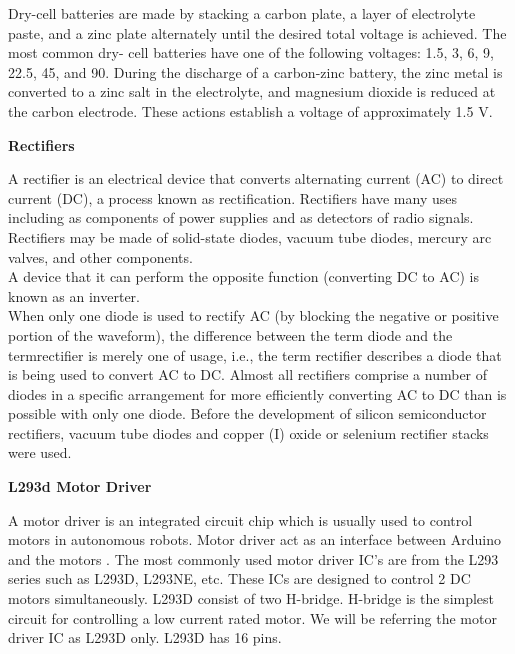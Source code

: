 \documentclass[a4paper,12pt, English]{article}
\begin{document}
\begin{normalsize}
Dry-cell batteries are made by stacking a carbon plate, a layer of electrolyte paste, and a zinc
plate alternately until the desired total voltage is achieved. The most common dry- cell batteries
have one of the following voltages: 1.5, 3, 6, 9, 22.5, 45, and 90. During the discharge of a
carbon-zinc battery, the zinc metal is converted to a zinc salt in the electrolyte, and magnesium
dioxide is reduced at the carbon electrode. These actions establish a voltage of approximately
1.5 V.\\
\newline
\begin{large}
\textbf{Rectifiers}
\end{large}
\newline
A rectifier is an electrical device that converts alternating current (AC) to direct
current (DC), a process known as rectification. Rectifiers have many uses including as
components of power supplies and as detectors of radio signals. Rectifiers may be made of
solid-state diodes, vacuum tube diodes, mercury arc valves, and other components.\\
A device that it can perform the opposite function (converting DC to AC) is
known as an inverter.\\
When only one diode is used to rectify AC (by blocking the negative or positive
portion of the waveform), the difference between the term diode and the termrectifier is merely
one of usage, i.e., the term rectifier describes a diode that is being used to convert AC to DC.
Almost all rectifiers comprise a number of diodes in a specific arrangement for more efficiently
converting AC to DC than is possible with only one diode. Before the development of silicon
semiconductor rectifiers, vacuum tube diodes and copper
(I) oxide or selenium rectifier stacks were used.\\
\newline
\begin{large}
\textbf{L293d Motor Driver}
\end{large}
\newline
A motor driver is an integrated circuit chip which is usually used to control motors in autonomous robots. Motor driver act as an interface between Arduino and the motors . The most commonly used motor driver IC’s are from the L293 series such as L293D, L293NE, etc. These ICs are designed to control 2 DC motors simultaneously. L293D consist of two H-bridge. H-bridge is the simplest circuit for controlling a low current rated motor. We will be referring the motor driver IC as L293D only. L293D has 16 pins.\\

\end{normalsize}
\end{document}
